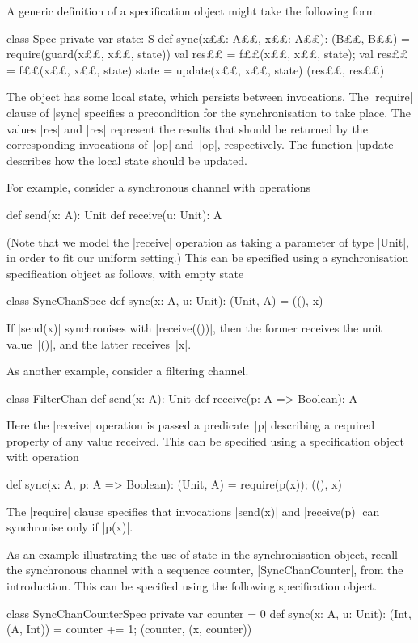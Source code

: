 A generic definition of a specification object might take the following form
%
\begin{scala}
class Spec{
  private var state: S
  def sync(x££: A££, x££: A££): (B££, B££) = {
    require(guard(x££, x££, state))
    val res££ = f££(x££, x££, state); val res££ = f££(x££, x££, state)
    state = update(x££, x££, state)
    (res££, res££)
  }
}
\end{scala}
%
The object has some local state, which persists between invocations.  The
|require| clause of |sync| specifies a precondition for the synchronisation to
take place.  The values |res| and |res| represent the results that
should be returned by the corresponding invocations of~|op| and~|op|,
respectively.  The function |update| describes how the local state should be
updated. 

For example, consider a synchronous channel with operations
\begin{scala}
  def send(x: A): Unit
  def receive(u: Unit): A
\end{scala}
%
(Note that we model the |receive| operation as taking a parameter of type
|Unit|, in order to fit our uniform setting.) 
%
This can be specified using a synchronisation specification object as follows,
with empty state
\begin{scala}
class SyncChanSpec{
  def sync(x: A, u: Unit): (Unit, A) = ((), x)
}
\end{scala}
%
If |send(x)| synchronises with |receive(())|, then the former receives the
unit value~|()|, and the latter receives~|x|. 

As another example, consider a filtering channel.
\begin{scala}
class FilterChan{
  def send(x: A): Unit
  def receive(p: A => Boolean): A
}
\end{scala}
%
Here the |receive| operation is passed a predicate~|p| describing a required
property of any value received.  This can be specified using a specification
object with operation
%
\begin{scala}
  def sync(x: A, p: A => Boolean): (Unit, A) = { require(p(x)); ((), x) }
\end{scala}
%
The |require| clause specifies that invocations |send(x)| and |receive(p)| can
synchronise only if |p(x)|.

As an example illustrating the use of state in the synchronisation object,
recall the synchronous channel with a sequence counter, |SyncChanCounter|,
from the introduction.  This can be specified using the following
specification object.
%
\begin{scala}
class SyncChanCounterSpec{
  private var counter = 0
  def sync(x: A, u: Unit): (Int, (A, Int)) = {
    counter += 1; (counter, (x, counter))
  }
}
\end{scala}


